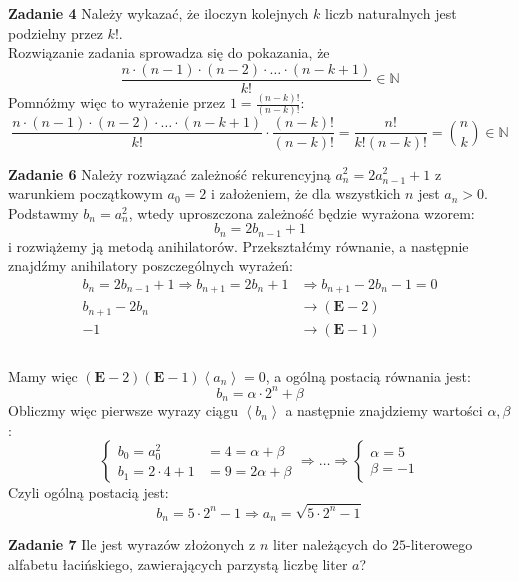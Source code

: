 \documentclass[a4paper,12pt]{article}
\newcommand{\annihilator}{\mathbf{E}}					%
\newcommand{\sequence}[1]{\left\langle #1 \right\rangle} %
\begin{document}
\noindent \newline \textbf{Zadanie 4} \newline
Należy wykazać, że iloczyn kolejnych $k$ liczb naturalnych jest podzielny przez $k!$.\\

\noindent Rozwiązanie zadania sprowadza się do pokazania, że
\[ \frac{n \cdot (n-1) \cdot (n-2) \cdot \ldots \cdot (n-k+1)}{k!} \in \mathbb{N} \]
Pomnóżmy więc to wyrażenie przez $1 = \frac{(n-k)!}{(n-k)!}$:
\[ \frac{n \cdot (n-1) \cdot (n-2) \cdot \ldots \cdot (n-k+1)}{k!} \cdot \frac{(n-k)!}{(n-k)!} = \frac{n!}{k!(n-k)!} = \binom{n}{k} \in \mathbb{N} \]

\newpage
\noindent \textbf{Zadanie 6} \newline
Należy rozwiązać zależność rekurencyjną $a_n^2 = 2 a_{n-1}^2 + 1$ z warunkiem początkowym $a_0 = 2$ i założeniem, że dla wszystkich $n$ jest $a_n > 0$. \\

\noindent Podstawmy $b_n = a_n^2$, wtedy uproszczona zależność będzie wyrażona wzorem:
\[ b_n = 2 b_{n-1} + 1 \]
i rozwiążemy ją metodą anihilatorów. Przekształćmy równanie, a następnie znajdźmy anihilatory poszczególnych wyrażeń:
\begin{align*}
	b_n = 2 b_{n-1} + 1  \Longrightarrow  b_{n+1} = 2 b_n + 1 &\Longrightarrow b_{n+1} - 2 b_n - 1 = 0 \\
	b_{n+1} - 2 b_n 	&\longrightarrow (\annihilator - 2) \\
	-1					&\longrightarrow (\annihilator - 1) \\
\end{align*}\\[-30pt]
Mamy więc $(\annihilator - 2)(\annihilator - 1) \sequence{a_n} = 0$, a ogólną postacią równania jest:
\[ b_n = \alpha \cdot 2^n + \beta \]
Obliczmy więc pierwsze wyrazy ciągu $\sequence{b_n}$ a następnie znajdziemy wartości $\alpha, \beta$:
\[
\begin{cases}
	b_0 = a_0^2 		&= 4 = \alpha + \beta \\
	b_1 = 2\cdot 4 + 1 	&= 9 = 2\alpha + \beta
\end{cases}	
\Rightarrow \ldots \Rightarrow
\begin{cases}
	\alpha = 5 \\
	\beta = -1
\end{cases}
\]
Czyli ogólną postacią jest:
\[ b_n = 5 \cdot 2^n - 1 \Longrightarrow a_n = \sqrt{5 \cdot 2^n - 1} \]


\noindent \newline \textbf{Zadanie 7} \newline
Ile jest wyrazów złożonych z $n$ liter należących do $25$-literowego alfabetu łacińskiego, zawierających parzystą liczbę liter $a$? \\
\end{document}
